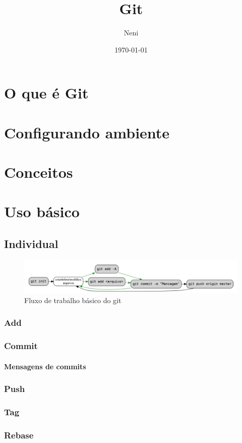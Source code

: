 \documentclass{apostila}
\title{Git}
\author{Neni}
\date{\today}
\begin{document}
\chapter{O que é Git}


\chapter{Configurando ambiente}


\chapter{Conceitos}


\chapter{Uso básico}

\section{Individual}
\begin{figure}[h]
  \caption{Fluxo de trabalho básico do git}
  \centering\includegraphics[width=\textwidth]{fluxo-simples.png}
\end{figure}
\subsection{Add}
\subsection{Commit}
\subsubsection{Mensagens de commits}
\subsection{Push}
\subsection{Tag}
\subsection{Rebase}
\end{document}
